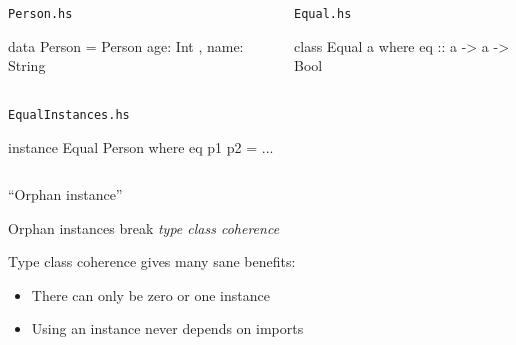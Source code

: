 \documentclass[usenames,dvipsnames,svgnames,table,aspectratio=169,mathserif]{beamer}
\begin{document}
\begin{frame}[fragile]

\begin{columns}
\begin{column}[T]{0.49\textwidth}
\begin{block}{\tt Person.hs}
\begin{haskellcode}
data Person = Person
  { age: Int
  , name: String }
\end{haskellcode}
\end{block}
\end{column}
\begin{column}{0.02\textwidth}
\end{column}
\begin{column}[T]{0.49\textwidth}
\begin{block}{\tt Equal.hs}
\begin{haskellcode}
class Equal a where
  eq :: a -> a -> Bool
\end{haskellcode}
\end{block}
\end{column}
\end{columns}

\begin{columns}
\begin{column}{0.5\textwidth}
\begin{block}{\tt EqualInstances.hs}
\begin{haskellcode}
instance Equal Person where
  eq p1 p2 = ...
\end{haskellcode}
\end{block}
\end{column}
\end{columns}
\pause
\begin{center}
``Orphan instance''

Orphan instances break {\it type class coherence}
\end{center}

\end{frame}


\begin{frame}
Type class coherence gives many sane benefits:

\begin{itemize}
\item There can only be zero or one instance 
\item Using an instance never depends on imports
\end{itemize}
\end{frame}
\end{document}
